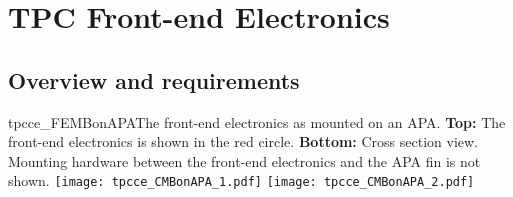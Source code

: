 





\section{TPC Front-end Electronics}
\label{ch:ce}

%
\subsection{Overview and requirements}
\label{subsec:ce_intro}

\begin{cdrfigure}{tpcce_FEMBonAPA}{The 
front-end electronics as mounted on an APA.
  {\bf Top:} The front-end electronics is shown in the red circle.
  {\bf Bottom:} Cross section view. Mounting hardware between the front-end electronics 
and the APA fin is not shown.}
\texttt{[image: tpcce\_CMBonAPA\_1.pdf]}
\texttt{[image: tpcce\_CMBonAPA\_2.pdf]}
\end{cdrfigure}

